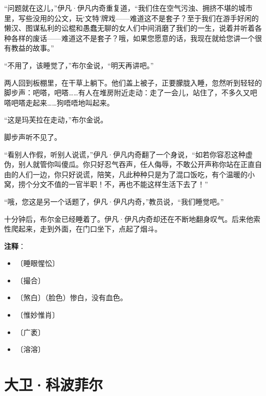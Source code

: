 \documentclass[12pt,UTF-8,openany]{ctexbook}
\begin{document}
\begin{normalsize}
    “问题就在这儿，”伊凡·伊凡内奇重复道，“我们住在空气污浊、拥挤不堪的城市里，写些没用的公文，玩‘文特’牌戏——难道这不是套子？至于我们在游手好闲的懒汉、图谋私利的讼棍和愚蠢无聊的女人们中间消磨了我们的一生，说着并听着各种各样的废话——难道这不是套子？哦，如果您愿意的话，我现在就给您讲一个很有教益的故事。”
    
    “不用了，该睡觉了，”布尔金说，“明天再讲吧。”
    
    两人回到板棚里，在干草上躺下。他们盖上被子，正要朦胧入睡，忽然听到轻轻的脚步声：吧嗒，吧嗒……有人在堆房附近走动：走了一会儿，站住了，不多久又吧嗒吧嗒走起来……狗唔唔地叫起来。
    
    “这是玛芙拉在走动，”布尔金说。
    
    脚步声听不见了。
    
    “看别人作假，听别人说谎，”伊凡·伊凡内奇翻了一个身说，“如若你容忍这种虚伪，别人就管你叫傻瓜。你只好忍气吞声，任人侮辱，不敢公开声称你站在正直自由的人们一边，你只好说谎，陪笑，凡此种种只是为了混口饭吃，有个温暖的小窝，捞个分文不值的一官半职！不，再也不能这样生活下去了！”
    
    “哦，您这是另一个话题了，伊凡·伊凡内奇，”教员说，“我们睡觉吧。”
    
    十分钟后，布尔金已经睡着了。伊凡·伊凡内奇却还在不断地翻身叹气。后来他索性爬起来，走到外面，在门口坐下，点起了烟斗。
    
\end{normalsize}


\newpage

\textbf{注释}：

\vspace{-1em}

\begin{itemize}
    \setlength\itemsep{-0.2em}
    \item 〔睡眼惺忪〕
    \item 〔撮合〕
    \item 〔煞白〕（脸色）惨白，没有血色。
    \item 〔惟妙惟肖〕
    \item 〔广袤〕
    \item 〔溶溶〕
\end{itemize}

\chapter{大卫·科波菲尔}
\end{document}
